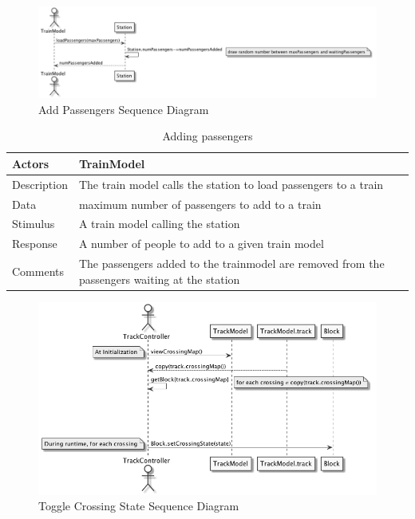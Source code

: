 \documentclass[]{article}
\begin{document}
\begin{figure}[H]
	\centering
	\includegraphics[width=\textwidth]{addPassengers.png}
	\caption{Add Passengers Sequence Diagram}
\end{figure}
\begin{table}[H]
	\centering
	\caption{Adding passengers}
	\begin{tabular}{|l|l|}
		\hline
		Actors & \parbox[t]{10cm}{TrainModel} \\ \hline
		Description & \parbox[t]{10cm}{The train model calls the station to load passengers to a train} \\ \hline
		Data &  \parbox[t]{10cm}{maximum number of passengers to add to a train} \\ \hline
		Stimulus &  \parbox[t]{10cm}{A train model calling the station} \\ \hline
		Response & \parbox[t]{10cm}{A number of people to add to a given train model}\\ \hline
		Comments & \parbox[t]{10cm}{The passengers added to the trainmodel are removed from the passengers waiting at the station}  \\ \hline
	\end{tabular}
\end{table}

\begin{figure}[H]
	\centering
	\includegraphics[scale=.5]{crossing.png}
	\caption{Toggle Crossing State Sequence Diagram}
\end{figure}
\end{document}
